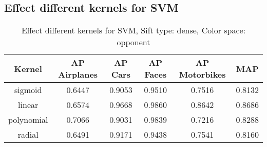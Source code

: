 






\subsection{Effect different kernels for SVM}

\begin{table}[H]
\begin{tabular}{|c|ccccc|}
\hline
\textbf{Kernel} & \textbf{AP Airplanes} & \textbf{AP Cars} & \textbf{AP Faces} & \textbf{AP Motorbikes} & \textbf{MAP}\\
\hline
sigmoid & 0.6447 & 0.9053 & 0.9510 & 0.7516 & 0.8132\\
linear & 0.6574 & 0.9668 & 0.9860 & 0.8642 & 0.8686 \\
polynomial & 0.7066 & 0.9031 & 0.9839& 0.7216& 0.8288\\
radial & 0.6491 & 0.9171 & 0.9438 & 0.7541 & 0.8160\\
\hline
\end{tabular}
\caption{Effect different kernels for SVM, Sift type: dense, Color space: opponent}
\end{table}
